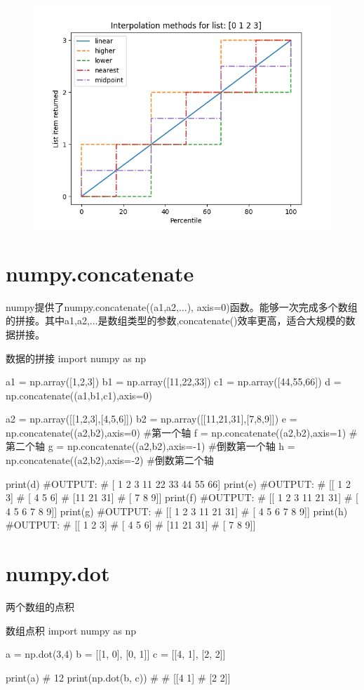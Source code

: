\documentclass[11pt]{article}
\begin{document}
\begin{figure}[H]
	\centering
	\includegraphics[scale=0.4]{percentile}
\end{figure}
\section{numpy.concatenate}
numpy提供了numpy.concatenate((a1,a2,...), axis=0)函数。能够一次完成多个数组的拼接。其中a1,a2,...是数组类型的参数,concatenate()效率更高，适合大规模的数据拼接。
\begin{Python}{数据的拼接}
import numpy as np

a1 = np.array([1,2,3])
b1 = np.array([11,22,33])
c1 = np.array([44,55,66])
d = np.concatenate((a1,b1,c1),axis=0)

a2 = np.array([[1,2,3],[4,5,6]])
b2 = np.array([[11,21,31],[7,8,9]])
e = np.concatenate((a2,b2),axis=0)		#第一个轴
f = np.concatenate((a2,b2),axis=1)		#第二个轴
g = np.concatenate((a2,b2),axis=-1)		#倒数第一个轴
h = np.concatenate((a2,b2),axis=-2)		#倒数第二个轴

print(d)
#OUTPUT:
#       [ 1  2  3 11 22 33 44 55 66]
print(e)
#OUTPUT:
#       [[ 1  2  3]
#        [ 4  5  6]
#        [11 21 31]
#        [ 7  8  9]]
print(f)
#OUTPUT:
#       [[ 1  2  3 11 21 31]
#        [ 4  5  6  7  8  9]]
print(g)
#OUTPUT:
#		[[ 1  2  3 11 21 31]
#		 [ 4  5  6  7  8  9]]
print(h)
#OUTPUT:
#		[[ 1  2  3]
#		 [ 4  5  6]
#		 [11 21 31]
#		 [ 7  8  9]]
\end{Python}
\section{numpy.dot}
两个数组的点积
\begin{Python}{数组点积}
import numpy as np

a = np.dot(3,4)
b = [[1, 0], [0, 1]]
c = [[4, 1], [2, 2]]

print(a)    
# 12
print(np.dot(b, c))
#
#  [[4 1]
#   [2 2]]
\end{Python}
\end{document}
